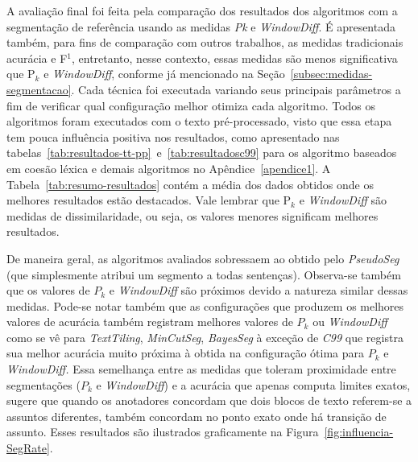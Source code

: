 A avaliação final foi feita pela comparação dos resultados dos algoritmos com a segmentação de referência usando as medidas \textit{Pk} e \textit{WindowDiff}. É apresentada também, para fins de comparação com outros trabalhos, as medidas tradicionais acurácia e F$^1$, entretanto, nesse contexto, essas medidas são menos significativa que P$_k$ e \textit{WindowDiff}, conforme já mencionado na Seção~\ref{subsec:medidas-segmentacao}. 
Cada técnica foi executada variando seus principais parâmetros a fim de verificar qual configuração melhor otimiza cada algoritmo. Todos os algoritmos foram executados com o texto pré-processado, visto que essa etapa tem pouca influência positiva nos resultados, como apresentado nas tabelas~\ref{tab:resultados-tt-pp}~e~\ref{tab:resultadosc99} para os algoritmo baseados em coesão léxica e demais algoritmos no Apêndice~\ref{apendice1}.
%
A Tabela~\ref{tab:resumo-resultados} contém a média dos dados obtidos onde os melhores resultados estão destacados. Vale lembrar que P$_k$ e \textit{WindowDiff} são medidas de dissimilaridade, ou seja, os valores menores significam melhores resultados.





De maneira geral, as algoritmos avaliados sobressaem ao obtido pelo \textit{PseudoSeg} (que simplesmente atribui um segmento a todas sentenças). Observa-se também que os valores de $P_k$ e \textit{WindowDiff} são próximos devido a natureza similar dessas medidas. Pode-se notar também que as configurações que produzem os melhores valores de acurácia também registram melhores valores de $P_k$ ou \textit{WindowDiff} como se vê para \textit{TextTiling}, \textit{MinCutSeg}, \textit{BayesSeg} à exceção de \textit{C99} que registra sua melhor acurácia muito próxima à obtida na configuração ótima para $P_k$ e \textit{WindowDiff.} 
Essa semelhança entre as medidas que toleram proximidade entre segmentações ($P_k$  e \textit{WindowDiff}) e a acurácia que apenas computa limites exatos, sugere que quando os anotadores concordam que dois blocos de texto referem-se a assuntos diferentes, também concordam no ponto exato onde há transição de assunto.  Esses resultados são ilustrados graficamente na Figura~\ref{fig:influencia-SegRate}.



